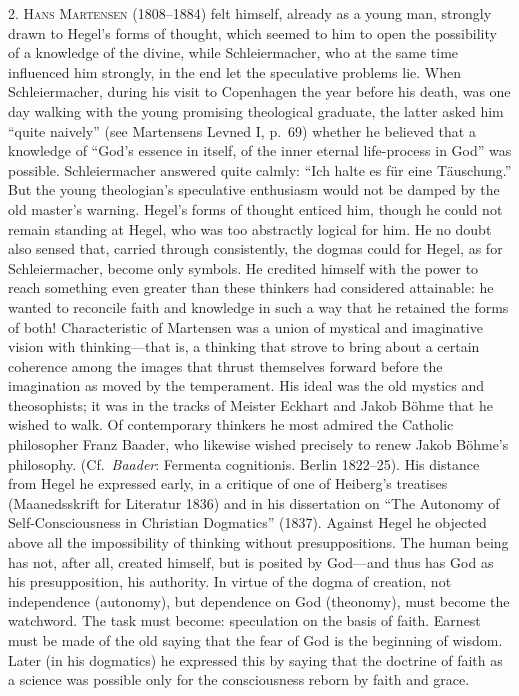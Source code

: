 \documentclass[12pt,a4paper]{book}
\newcommand{\opage}[1]{\marginnote{\footnotesize\textit{[#1]}}}
\begin{document}
\opage{18}2. \textsc{Hans Martensen} (1808--1884) felt himself,
already as a young man, strongly drawn to Hegel's forms of thought, which
seemed to him to open the possibility of a knowledge of the divine, while
Schleiermacher, who at the same time influenced him strongly, in the end
let the speculative problems lie. When Schleiermacher, during his visit to
Copenhagen the year before his death, was one day walking with the young
promising theological graduate, the latter asked him ``quite naively''
(see Martensens Levned I, p.~69) whether he believed that a
knowledge of ``God's essence in itself, of the inner eternal life-process
in God'' was possible. Schleiermacher answered quite calmly: ``Ich halte
es für eine Täuschung.'' But the young theologian's speculative
enthusiasm would not be damped by the old master's warning. Hegel's forms
of thought enticed him, though he could not remain standing at Hegel, who
was too abstractly logical for him. He no doubt also sensed that, carried
through consistently, the dogmas could for Hegel, as for Schleiermacher,
become only symbols. He credited himself with the power to reach something
even greater than these thinkers had considered attainable: he wanted to
reconcile faith and knowledge in such a way that he retained the forms of
both! Characteristic of Martensen was a union of mystical and imaginative
vision with thinking---that is, a thinking that strove to bring about a
certain coherence among the images that thrust themselves forward before
the imagination as moved by the temperament. His ideal was the old
mystics and theosophists; it was in the tracks of Meister Eckhart and
Jakob Böhme that he wished to walk. Of contemporary thinkers he most
admired the Catholic philosopher Franz Baader, who likewise wished
precisely to renew Jakob Böhme's philosophy.
(Cf.\ \textit{Baader}: Fermenta cognitionis. Berlin 1822--25). His
distance from Hegel he expressed early, in a critique of one of Heiberg's
treatises (Maanedsskrift for Literatur 1836) and in his
\opage{19}dissertation on ``The Autonomy of Self-Consciousness in Christian
Dogmatics'' (1837). Against Hegel he objected above all the
impossibility of thinking without presuppositions. The human being has
not, after all, created himself, but is posited by God---and thus has God
as his presupposition, his authority. In virtue of the dogma of creation,
not independence (autonomy), but dependence on God (theonomy), must
become the watchword. The task must become: speculation on the basis of
faith. Earnest must be made of the old saying that the fear of God is the
beginning of wisdom. Later (in his dogmatics) he expressed this by saying
that the doctrine of faith as a science was possible only for the
consciousness reborn by faith and grace.
\end{document}
